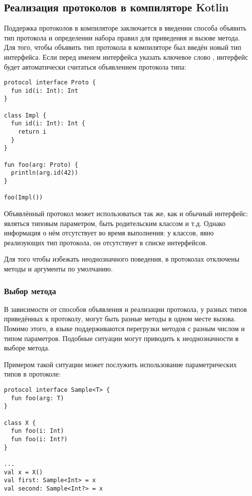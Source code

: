\subsection{Реализация протоколов в компиляторе Kotlin}

Поддержка протоколов в компиляторе заключается в введении способа объявить тип протокола и определении набора правил для приведения и вызове метода. Для того, чтобы объявить тип протокола в компиляторе был введён новый тип интерфейса. Если перед именем интерфейса указать ключевое слово , интерфейс будет автоматически считаться объявлением протокола типа:

\begin{verbatim}
protocol interface Proto {
  fun id(i: Int): Int
}

class Impl {
  fun id(i: Int): Int {
    return i
  }
}

fun foo(arg: Proto) {
  println(arg.id(42))
}

foo(Impl())
\end{verbatim}

Объявлённый протокол может использоваться так же, как и обычный интерфейс: являться типовым параметром, быть родительским классом и т.д. Однако информация о нём отсутствует во время выполнения: у классов, явно реализующих тип протокола, он отсутствует в списке интерфейсов.

Для того чтобы избежать неоднозначного поведения, в протоколах отключены методы и аргументы по умолчанию.

\subsubsection{Выбор метода}

В зависимости от способов объявления и реализации протокола, у разных типов приведённых к протоколу, могут быть разные методы в одном месте вызова. Помимо этого, в языке  поддерживаются перегрузки методов с разным числом и типом параметров. Подобные ситуации могут приводить к неоднозначности в выборе метода.

Примером такой ситуации может послужить использование параметрических типов в протоколе:
\begin{verbatim}
protocol interface Sample<T> {
  fun foo(arg: T)
}

class X {
  fun foo(i: Int)
  fun foo(i: Int?)
}

...
val x = X()
val first: Sample<Int> = x
val second: Sample<Int?> = x

\end{verbatim}

